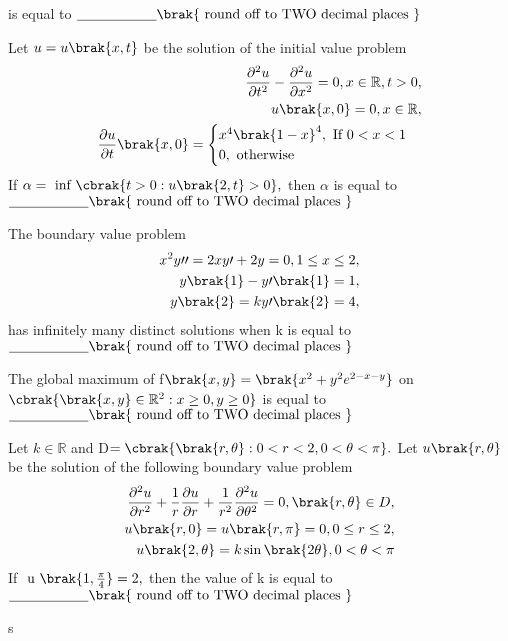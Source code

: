 is equal to $\underline{\hspace{2cm}} \brak{\text{ round off to TWO decimal places }}$
\bigskip
\item Let $u=u\brak{x,t}$ be the solution of the initial value problem 
\begin{align*}
    \frac{\partial^{2}u}{\partial t^{2}}-\frac{\partial^{2}u}{\partial x^{2}}=0,x\in\mathbb{R},t>0,\\
    u\brak{x,0}=0,x\in\mathbb{R},\\
    \frac{\partial u}{\partial t}\brak{x,0}=
    \begin{cases}
        x^{4}\brak{1-x}^{4}, \text{ If }0<x<1\\
        0, \text{ otherwise }
    \end{cases}
\end{align*}
If $\alpha=\text{ inf }\cbrak{t>0:u\brak{2,t}>0},$ then $\alpha$ is equal to $\underline{\hspace{2cm}} \brak{\text{ round off to TWO decimal places }}$
\bigskip
\item The boundary value problem
\begin{align}
    x^{2}y\prime\prime=2xy\prime+2y=0, 1\leq x\leq2,\\
    y\brak{1}-y\prime\brak{1}=1,\\
    y\brak{2}=ky\prime\brak{2}=4,\\
\end{align}
has infinitely many distinct solutions when k is equal to   $\underline{\hspace{2cm}} \brak{\text{ round off to TWO decimal places }}$
\bigskip
\item The global maximum of f$\brak{x,y}=\brak{x^{2}+y^{2}e^{2-x-y}}$ on $\cbrak{\brak{x,y}\in\mathbb{R}^{2}:x\geq0,y\geq0}$ is equal to $\underline{\hspace{2cm}} \brak{\text{ round off to TWO decimal places }}$
\bigskip
\item Let $k\in\mathbb{R}$ and D$=\cbrak{\brak{r,\theta}:0<r<2,0<\theta<\pi}.$ Let $u\brak{r,\theta}$ be the solution of the
following boundary value problem
\begin{align*}
    \frac{\partial^{2}u}{\partial r^{2}}+\frac{1}{r}\frac{\partial u}{\partial r}+\frac{1}{r^{2}}\frac{\partial^{2}u}{\partial \theta^{2}}=0,\brak{r,\theta}\in D,\\
    u\brak{r,0}=u\brak{r,\pi}=0, 0\leq r\leq2,\\
    u\brak{2,\theta}=k\sin\brak{2\theta},0<\theta<\pi\\
\end{align*}
If $\text{ u }\brak{1,\frac{\pi}{4}}=2,$ then the value of k is equal to $\underline{\hspace{2cm}} \brak{\text{ round off to TWO decimal places }}$


s
